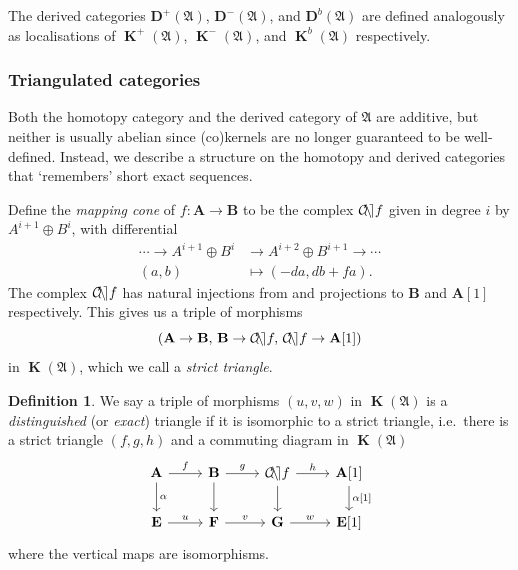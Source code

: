 \documentclass[a4paper]{article}
\theoremstyle{definition}
\newtheorem{defn}{Definition}[section]
\theoremstyle{remark}
\DeclareMathOperator{\cone}{\mathcal{C\kern -2pt o \kern -2pt n \kern -2pt e
\kern -2pt}}
\DeclareMathOperator{\kom}{{\mathbf{K}}}
\newcommand{\deri}{\mathbf{D}}
\begin{document}
The derived categories \(\deri^+(\mathfrak{A})\), \(\deri^-(\mathfrak{A})\),
and \(\deri^b(\mathfrak{A})\) are defined analogously as localisations of
\(\kom^+(\mathfrak{A})\), \(\kom^-(\mathfrak{A})\), and \(\kom^b(\mathfrak{A})\)
respectively.

\subsubsection{Triangulated categories} 

Both the homotopy category and the derived category of \(\mathfrak{A}\) are
additive, but neither is usually abelian since (co)kernels are no longer
guaranteed to be well-defined. Instead, we describe a structure on the homotopy
and derived categories that `remembers' short exact sequences. 

Define the \textit{mapping cone} of \(f:\mathbf{A}\rightarrow \mathbf{B}\) to be the complex \(\cone f\) given in degree \(i\) by \(A^{i+1}\oplus B^i\), with differential 
\begin{align*}
    \cdots \rightarrow A^{i+1}\oplus B^i &\longrightarrow A^{i+2}\oplus B^{i+1}
    \rightarrow \cdots \\ 
    (a,b) &\longmapsto (-da, db + fa).
\end{align*}
The complex \(\cone f\) has natural injections from and projections to
\(\mathbf{B}\) and \(\mathbf{A}[1]\) respectively. This gives us a triple of morphisms 
\[(\mathbf{A}\rightarrow \mathbf{B},\, \mathbf{B}\rightarrow \cone f,\, \cone f
\rightarrow \mathbf{A}[1])\]
in \(\kom(\mathfrak{A})\), which we call a \textit{strict triangle}. 

\begin{defn}
    We say a triple of morphisms \((u,v,w)\) in \(\kom (\mathfrak{A})\) is a
    \textit{distinguished} (or \textit{exact}) triangle if it is isomorphic to a
    strict triangle, i.e.\ there is a strict
    triangle \((f,g,h)\) and a commuting diagram in \(\kom(\mathfrak{A})\) 
    \[\begin{tikzcd}
        \mathbf{A} \arrow[r, "f"] \arrow[d, "\alpha"] 
        &\mathbf{B} \arrow[r, "g"] \arrow[d ] 
        &\cone f \arrow[r, "h"] \arrow[d ] 
        &\mathbf{A}[1] \arrow[d, "\alpha{[1]}"] \\
        \mathbf{E} \arrow[r, "u"]  
        &\mathbf{F} \arrow[r, "v"] 
        &\mathbf{G} \arrow[r, "w"]
        &\mathbf{E}[1] 
    \end{tikzcd}\]
    where the vertical maps are isomorphisms.
\end{defn}
\end{document}
